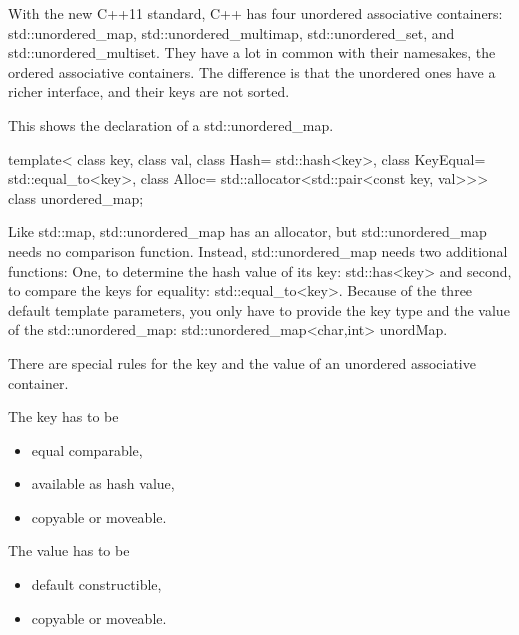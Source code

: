 





With the new C++11 standard, C++ has four unordered associative containers: std::unordered\_map, std::unordered\_multimap, std::unordered\_set, and std::unordered\_multiset. They have a lot in common with their namesakes, the ordered associative containers. The difference is that the unordered ones have a richer interface, and their keys are not sorted.

This shows the declaration of a std::unordered\_map.

\begin{cpp}
template< class key, class val, class Hash= std::hash<key>,
	      class KeyEqual= std::equal_to<key>,
          class Alloc= std::allocator<std::pair<const key, val>>>
class unordered_map;
\end{cpp}

Like std::map, std::unordered\_map has an allocator, but std::unordered\_map needs no comparison function. Instead, std::unordered\_map needs two additional functions: One, to determine the hash value of its key: std::has<key> and second, to compare the keys for equality: std::equal\_to<key>. Because of the three default template parameters, you only have to provide the key type and the value of the std::unordered\_map: std::unordered\_map<char,int> unordMap.


There are special rules for the key and the value of an unordered associative container.

The key has to be

\begin{itemize}
\item
equal comparable,

\item
available as hash value,

\item
copyable or moveable.
\end{itemize}

The value has to be

\begin{itemize}
\item
default constructible,

\item
copyable or moveable.
\end{itemize}

